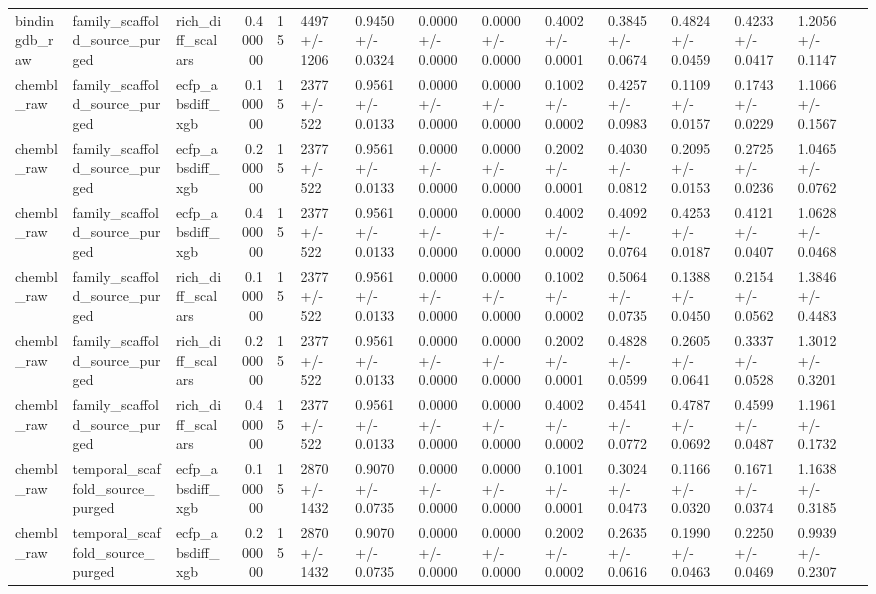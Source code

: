 \begin{longtable}{lllrlllllllllll}
bindingdb\_raw & family\_scaffold\_source\_purged & rich\_diff\_scalars & 0.400000 & 15 & 4497 +/- 1206 & 0.9450 +/- 0.0324 & 0.0000 +/- 0.0000 & 0.0000 +/- 0.0000 & 0.4002 +/- 0.0001 & 0.3845 +/- 0.0674 & 0.4824 +/- 0.0459 & 0.4233 +/- 0.0417 & 1.2056 +/- 0.1147 &  \\
chembl\_raw & family\_scaffold\_source\_purged & ecfp\_absdiff\_xgb & 0.100000 & 15 & 2377 +/- 522 & 0.9561 +/- 0.0133 & 0.0000 +/- 0.0000 & 0.0000 +/- 0.0000 & 0.1002 +/- 0.0002 & 0.4257 +/- 0.0983 & 0.1109 +/- 0.0157 & 0.1743 +/- 0.0229 & 1.1066 +/- 0.1567 &  \\
chembl\_raw & family\_scaffold\_source\_purged & ecfp\_absdiff\_xgb & 0.200000 & 15 & 2377 +/- 522 & 0.9561 +/- 0.0133 & 0.0000 +/- 0.0000 & 0.0000 +/- 0.0000 & 0.2002 +/- 0.0001 & 0.4030 +/- 0.0812 & 0.2095 +/- 0.0153 & 0.2725 +/- 0.0236 & 1.0465 +/- 0.0762 &  \\
chembl\_raw & family\_scaffold\_source\_purged & ecfp\_absdiff\_xgb & 0.400000 & 15 & 2377 +/- 522 & 0.9561 +/- 0.0133 & 0.0000 +/- 0.0000 & 0.0000 +/- 0.0000 & 0.4002 +/- 0.0002 & 0.4092 +/- 0.0764 & 0.4253 +/- 0.0187 & 0.4121 +/- 0.0407 & 1.0628 +/- 0.0468 &  \\
chembl\_raw & family\_scaffold\_source\_purged & rich\_diff\_scalars & 0.100000 & 15 & 2377 +/- 522 & 0.9561 +/- 0.0133 & 0.0000 +/- 0.0000 & 0.0000 +/- 0.0000 & 0.1002 +/- 0.0002 & 0.5064 +/- 0.0735 & 0.1388 +/- 0.0450 & 0.2154 +/- 0.0562 & 1.3846 +/- 0.4483 &  \\
chembl\_raw & family\_scaffold\_source\_purged & rich\_diff\_scalars & 0.200000 & 15 & 2377 +/- 522 & 0.9561 +/- 0.0133 & 0.0000 +/- 0.0000 & 0.0000 +/- 0.0000 & 0.2002 +/- 0.0001 & 0.4828 +/- 0.0599 & 0.2605 +/- 0.0641 & 0.3337 +/- 0.0528 & 1.3012 +/- 0.3201 &  \\
chembl\_raw & family\_scaffold\_source\_purged & rich\_diff\_scalars & 0.400000 & 15 & 2377 +/- 522 & 0.9561 +/- 0.0133 & 0.0000 +/- 0.0000 & 0.0000 +/- 0.0000 & 0.4002 +/- 0.0002 & 0.4541 +/- 0.0772 & 0.4787 +/- 0.0692 & 0.4599 +/- 0.0487 & 1.1961 +/- 0.1732 &  \\
chembl\_raw & temporal\_scaffold\_source\_purged & ecfp\_absdiff\_xgb & 0.100000 & 15 & 2870 +/- 1432 & 0.9070 +/- 0.0735 & 0.0000 +/- 0.0000 & 0.0000 +/- 0.0000 & 0.1001 +/- 0.0001 & 0.3024 +/- 0.0473 & 0.1166 +/- 0.0320 & 0.1671 +/- 0.0374 & 1.1638 +/- 0.3185 &  \\
chembl\_raw & temporal\_scaffold\_source\_purged & ecfp\_absdiff\_xgb & 0.200000 & 15 & 2870 +/- 1432 & 0.9070 +/- 0.0735 & 0.0000 +/- 0.0000 & 0.0000 +/- 0.0000 & 0.2002 +/- 0.0002 & 0.2635 +/- 0.0616 & 0.1990 +/- 0.0463 & 0.2250 +/- 0.0469 & 0.9939 +/- 0.2307 &  \\

\end{longtable}
